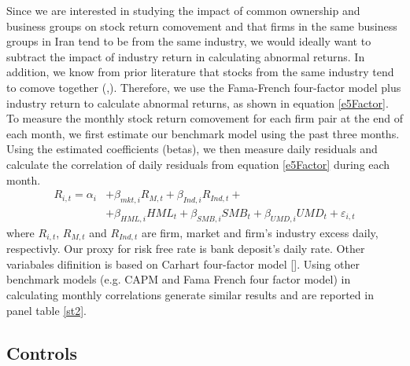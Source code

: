 Since we are interested in studying the impact of common ownership and business groups on stock return comovement and that firms in the same business groups in Iran tend to be from the same industry, we would ideally want to subtract the impact of industry return in calculating abnormal returns. In addition, we know from prior literature that stocks from the same industry tend to comove together {(\cite{king1966market},\cite{meyers1973re})}. Therefore, we use the Fama-French four-factor model plus industry return to calculate abnormal returns, as shown in equation \ref{e5Factor}. To measure the monthly stock return comovement for each firm pair at the end of each month, we first estimate our benchmark model using the past three months. Using the estimated coefficients (betas), we then measure daily residuals and calculate the correlation of daily residuals from equation \ref{e5Factor} during each month. 
	\begin{equation}
		\begin{split}
			R_{i,t} =\alpha _{i}&+\beta _{mkt,i}{\mathit {R}}_{M,t} + \beta_{Ind,i}{\mathit {R}}_{Ind,t} + \\
			&+\beta _{HML,i}{\mathit {HML}}_{t}+\beta _{SMB,i}{\mathit {SMB}}_{t}+\beta _{UMD,i}{\mathit {UMD}}_{t}+ \varepsilon_{i,t}
		\end{split}
		\label{e5Factor}
	\end{equation}
	where $ R_{i,t} $, $ R_{M,t} $ and $ R_{Ind,t} $ are firm, market and firm's industry excess daily, respectivly. Our proxy for risk free rate is bank deposit's daily rate. Other variabales difinition is based on Carhart four-factor model [\cite{Carhart4Factor}]. Using other benchmark models (e.g. CAPM and Fama French four factor model) in calculating monthly correlations generate similar results and are reported in panel  table \ref{st2}. 
	
	
	
	
%			



\FloatBarrier


\subsection{Controls}

